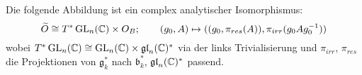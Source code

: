 \begin{comment}
\textbf{Symplectic aspects of the group cotangent bundles.}
\ccite[p. 19]{thboalch}
Let $G$ be a Lie group.
The \textbf{left multiplication} $L_g:G\to G; h\mapsto gh$ gives an isomrphism
\[
(dL_g)_i:\mathfrak g=T_1G\to T_gG
\]
and induces a trivialization:
\[
G\times\mathfrak g\cong TG; \qquad (g,X)\mapsto (g,(dL_g)_1X)
\]
which will be referred to as the \emph{left trivialization} of $TG$.

By taking the duals the left trivialization of the cotangent bundle is also
obtained:
\[
G\times \mathfrak g^* \cong T^*G;\qquad(g,A)\mapsto(g,(dL_{g^{-1}})_1^\vee A)
\]
where $(dL_{g^{-1}})_1^\vee$ denotes the inverse of the dual linear map to
$(dV_g)_1$.

Now we can write down the natural symplectic structure on $T^∗G$ explicitly:
\begin{lem}
\ccite[Lemma 1.45]{thboalch}
\end{lem}
\begin{proof}
\TODO
\end{proof}
If the right trivializations are used instead, the formula looks the same upto
one sign:
\begin{lem}
\ccite[Lemma 1.46]{thboalch}
\end{lem}
\begin{proof}
\TODO
\end{proof}
\end{comment}
\begin{lem}  
Die folgende Abbildung ist ein complex analytischer Isomorphismus:
\[
\widetilde O\cong T^*\operatorname{GL}_n(\mathbb{C})\times O_B;\qquad
  (g_0,A)\mapsto ((g_0,\pi_{res}(A)),\pi_{irr}(g_0Ag_0^{-1}))
\]
wobei $T^*\operatorname{GL}_n(\mathbb{C})\cong \operatorname{GL}_n(\mathbb{C})\times\mathfrak{gl}_n(\mathbb{C})^*$ via der links
Trivialisierung und $\pi_{irr}$, $\pi_{res}$ die Projektionen von $\mathfrak
g_k^*$ nach $\mathfrak b_k^*$, $\mathfrak{gl}_n(\mathbb{C})^*$ passend.
\end{lem}
